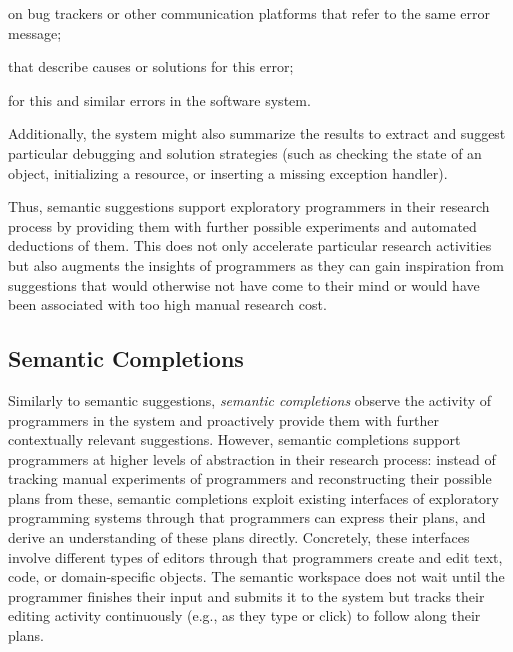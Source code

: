 	\begin{description}[noextralabelsep]
		\item[bug reports] on bug trackers or other communication platforms that refer to the same error message;
		\item[documentation artifacts] that describe causes or solutions for this error;
		\item[exception handlers] for this and similar errors in the software system.
	\end{description}

	\noindent
	Additionally, the system might also summarize the results to extract and suggest particular debugging and solution strategies (such as checking the state of an object, initializing a resource, or inserting a missing exception handler).

\ParSep

Thus, semantic suggestions support exploratory programmers in their research process by providing them with further possible experiments and automated deductions of them.
This does not only accelerate particular research activities but also augments the insights of programmers as they can gain inspiration from suggestions that would otherwise not have come to their mind or would have been associated with too high manual research cost.

\subsection{Semantic Completions}
\label{sec:approach/workspace/completions}

Similarly to semantic suggestions, \emph{semantic completions} observe the activity of programmers in the system and proactively provide them with further contextually relevant suggestions.
However, semantic completions support programmers at higher levels of abstraction in their research process:
instead of tracking manual experiments of programmers and reconstructing their possible plans from these, semantic completions exploit existing interfaces of exploratory programming systems through that programmers can express their plans, and derive an understanding of these plans directly.
Concretely, these interfaces involve different types of editors through that programmers create and edit text, code, or domain-specific objects.
The semantic workspace does not wait until the programmer finishes their input and submits it to the system but tracks their editing activity continuously (e.g., as they type or click) to follow along their plans.

